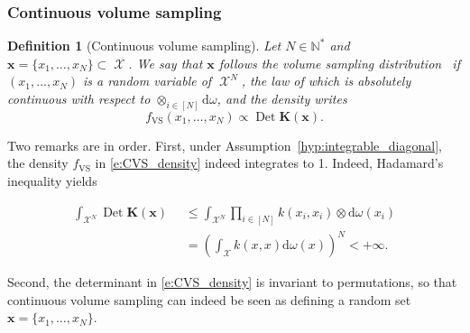 \documentclass[twoside,11pt]{book}
\newtheorem{definition}{Definition}
\numberwithin{theorem}{chapter}
\numberwithin{definition}{chapter}
\numberwithin{proposition}{chapter}
\numberwithin{corollary}{chapter}
\numberwithin{example}{chapter}
\numberwithin{lemma}{chapter}
\DeclareMathOperator{\Det}{Det}
\DeclareMathOperator{\VS}{\mathrm{VS}}
\DeclareMathOperator{\X}{\mathcal{X}}
\DeclareMathOperator{\MuTen}{\otimes\mathrm{d}\omega(x_{i})}
\begin{document}
\subsubsection{Continuous volume sampling}
\begin{definition}[Continuous volume sampling]\label{def:VS}
Let $N \in \mathbb{N}^{*}$ and $\bm{x} = \{x_{1}, \dots, x_{N}\}\subset \X$. We say that $\bm{x}$ follows the volume sampling distribution
 if $(x_{1}, \dots ,x_{N})$ is a random variable of $\X ^{N}$, the law of which is absolutely continuous with respect to $\otimes_{i \in [N]} \mathrm{d}\omega$, and the density writes
\begin{equation}
  \label{e:CVS_density}
f_{\VS}(x_{1}, \dots ,x_{N}) \propto \Det \bm{K}(\bm{x}).
\end{equation}
\end{definition}

Two remarks are in order. First, under Assumption~\ref{hyp:integrable_diagonal}, the density $f_{\VS}$ in  \eqref{e:CVS_density} indeed integrates to 1. Indeed, Hadamard's inequality yields

\begin{align}
\int_{\X ^{N}} \Det \bm{K}(\bm{x}) \MuTen & \leq \int_{\X ^{N}} \prod\limits_{i \in [N]} k(x_{i},x_{i}) \otimes\mathrm{d}\omega(x_{i}) \nonumber \\
& = \left(\int_{\X}k(x,x) \mathrm{d}\omega(x) \right)^{N}  < +\infty.
\end{align}

Second, the determinant in \eqref{e:CVS_density} is invariant to permutations, so that continuous volume sampling can indeed be seen as defining a random set $\bm{x} = \{x_1,\dots,x_N\}$.
\end{document}
